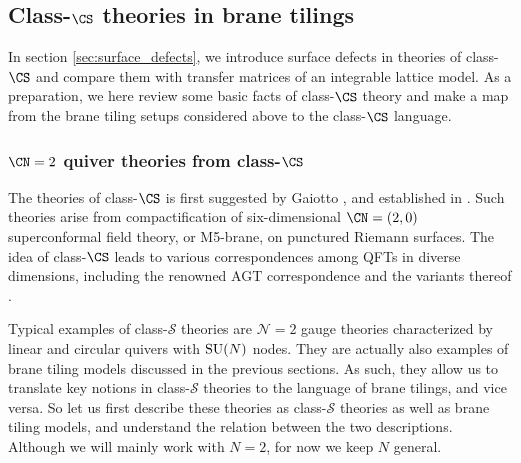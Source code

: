 \subsection{Class-$\CS$ theories in brane tilings}

In section \ref{sec:surface_defects}, we introduce surface defects in
theories of class-$\CS$ and compare them with transfer matrices of
an integrable lattice model.
As a preparation, we here review some basic facts of class-$\CS$ theory
and make a map from the brane tiling setups considered above
to the class-$\CS$ language.






\subsubsection{$\CN=2$ quiver theories from class-$\CS$}



The theories of class-$\CS$ is first suggested by Gaiotto \cite{Gaiotto:2009we},
and established in \cite{Gaiotto:2009hg}.
Such theories arise from compactification of six-dimensional $\CN=(2,0)$ superconformal
field theory, or M5-brane, on punctured Riemann surfaces.
The idea of class-$\CS$ leads to various correspondences among QFTs in diverse dimensions,
including the renowned AGT correspondence \cite{Alday:2009aq,Wyllard:2009hg}
and the variants thereof \cite{Gadde:2009kb,Gadde:2011ik,Dimofte:2011ju,Dimofte:2011py,Terashima:2011qi,Terashima:2012cx,Yagi:2013fda}.


Typical examples of class-$\mathcal{S}$ theories are $\mathcal{N}=2$
gauge theories characterized by linear and circular quivers with $\mathrm{SU}(N)$
nodes. They are actually also examples of brane tiling models discussed
in the previous sections. As such, they allow us to translate key
notions in class-$\mathcal{S}$ theories to the language of brane
tilings, and vice versa. So let us first describe these theories as
class-$\mathcal{S}$ theories as well as brane tiling models, and
understand the relation between the two descriptions. Although we
will mainly work with $N=2$, for now we keep $N$ general.

